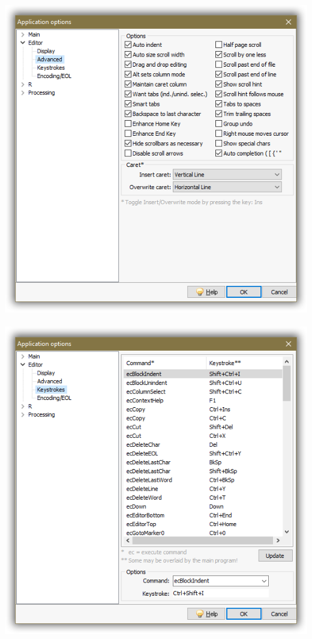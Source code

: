 \includegraphics[scale=0.40]{./res/app_editor_advanced.png}~~
\includegraphics[scale=0.40]{./res/app_editor_keystrokes.png}


